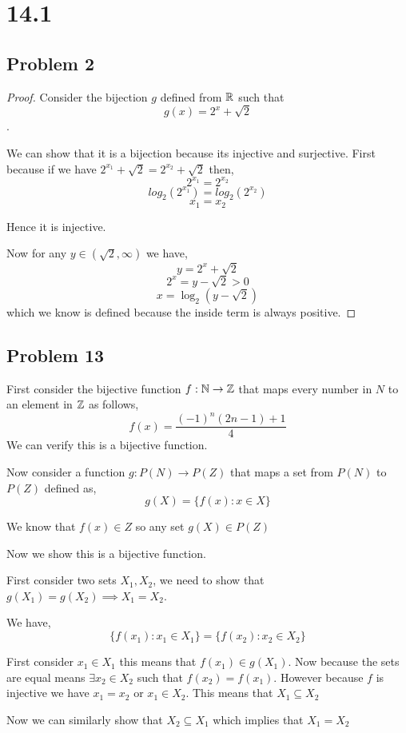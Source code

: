 \documentclass[a4paper]{report}
\begin{document}
\section*{14.1}
\subsection*{Problem 2}
\begin{proof}
    Consider the bijection $g$ defined from $\mathbb{R}$ such that  $$g(x) = 2^{x} + \sqrt{2}$$.

    We can show that it is a bijection because its injective and surjective. First because if we have $2^{x_1} + \sqrt{2} = 2^{x_2} + \sqrt{2}$ then, 
    $$ 2^{x_1} = 2^{x_2} $$ 
    $$ log_2(2^{x_1}) = log_2(2^{x_2}) $$ 
    $$ x_1= x_2 $$ 

    Hence it is injective.

    Now for any $y \in (\sqrt 2, \infty)$ we have, 
    $$ y = 2^{x} + \sqrt{2} $$ 
    $$ 2^{x} = y - \sqrt{2} > 0 $$ 
    $$ x = \log_2(y- \sqrt{2}) $$ 
    which we know is defined because the inside term is always positive.
\end{proof}



\subsection*{Problem 13}
First consider the bijective function  $f : \mathbb{N} \rightarrow \mathbb{Z}$ that maps every number in $N$ to an element in $\mathbb{Z}$ as follows, 
$$ f(x) = \frac{(-1)^{n}(2n - 1) + 1}{4} $$  We can verify this is a bijective function. 

Now consider a function $g : P(N) \rightarrow P(Z)$ that maps a set from  $P(N)$ to $P(Z)$ defined as,  
$$ g(X) = \{f(x): x \in X\} $$ 

We know that $f(x) \in Z$ so any set $g(X) \in P(Z)$

Now we show this is a bijective function.

First consider two sets $X_1,X_2$, we need to show that $g(X_1) = g(X_2) \implies X_1 =X_2$.

We have, $$\{f(x_1): x_1 \in X_1\} = \{f(x_2): x_2 \in X_2\}$$


First consider $x_1 \in X_1$ this means that $f(x_1) \in g(X_1)$. Now because the sets are equal means $\exists x_2 \in X_2$ such that $f(x_2) = f(x_1)$. However because $f$ is injective we have $x_1 = x_2$ or $x_1 \in X_2$. This means that $X_1 \subseteq X_2$

Now we can similarly show that $X_2 \subseteq X_1$ which implies that $X_1 = X_2$
\end{document}
